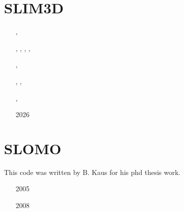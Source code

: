 \section{SLIM3D} 

\begin{small}
\begin{itemize}
\item[\twothousandeight]       \textcite{poso08}
\item[\twothousandten]         \textcite{qusp10}
\item[\twothousandtwelve]      \textcite{brps12}
\item[\twothousandthirteen]    \textcite{brps13},  \textcite{brau13}
\item[\twothousandfourteen]    \textcite{brun14},  \textcite{hebr14},  \textcite{kobf14},
                               \textcite{brhp14},  \textcite{duqo14}
\item[\twothousandfifteen]     \textcite{clbq15}
\item[\twothousandseventeen]   \textcite{brcr17},  \textcite{baso17} 
\item[\twothousandeighteen]    \textcite{basq18},  \textcite{osss18},  \textcite{osss18b}
\item[\twothousandnineteen]    \textcite{sobr19},  \textcite{stco19}
\item[\twothousandtwentyfour]  \textcite{anim24}
\item[2026] \textcite{muna26}
\end{itemize}
\end{small}


\section{SLOMO} 
This code was written by B. Kaus for his phd thesis work.

\begin{small}
\begin{itemize}
\item[2005] \textcite{kaus05}
\item[2008] \textcite{kasb08}
\end{itemize}
\end{small}

